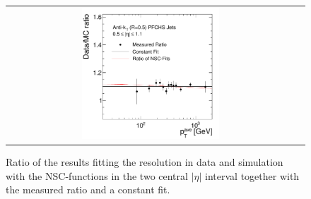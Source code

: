 \begin{description}
\begin{figure}[!p]
\begin{tabular}{cc}
                \includegraphics[width=0.49\textwidth]{figures/Pythia_NSCFit_Eta1_kNS_kC_ratio.pdf}\\
  \end{tabular}
  \caption{Ratio of the results fitting the resolution in data and simulation with the NSC-functions in the two central $|\eta|$ interval together with the measured ratio and a constant fit.}
  \label{fig:NSC_Fits_ratio}
\end{figure} 


\end{description}

